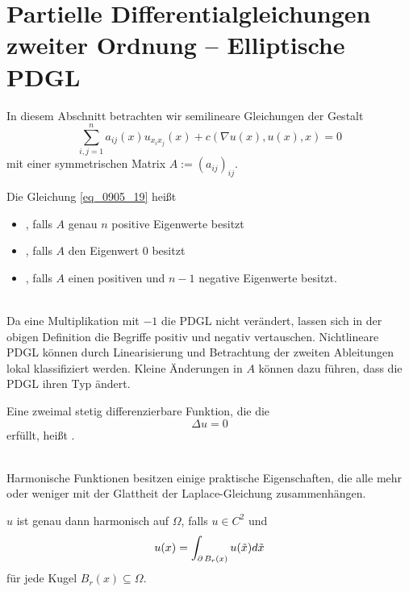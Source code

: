 \section{Partielle Differentialgleichungen zweiter Ordnung -- Elliptische PDGL}
\label{sec:para7}
	In diesem Abschnitt betrachten wir semilineare Gleichungen der Gestalt 
	\begin{equation}
		\sum\limits_{i,j=1}^{n} a_{ij}(x) u_{x_ix_j}(x) + c(\nabla u(x),u(x),x) = 0 \label{eq_0905_19}
	\end{equation}
	mit einer symmetrischen Matrix $A := (a_{ij})_{ij}$.
	
\begin{defn} \label{def_36}
	Die Gleichung \eqref{eq_0905_19} heißt \marginnote{[36]} \begin{itemize}
		\item {}, falls $A$ genau $n$ positive Eigenwerte besitzt
		\item {}, falls $A$ den Eigenwert $0$ besitzt
		\item {}, falls $A$ einen positiven und $n-1$ negative Eigenwerte besitzt.
	\end{itemize}
\end{defn}
	
\mbox{} \\
Da eine Multiplikation mit $-1$ die PDGL nicht verändert, lassen sich in der obigen Definition die Begriffe positiv und negativ vertauschen. Nichtlineare PDGL können durch Linearisierung und Betrachtung der zweiten Ableitungen lokal klassifiziert werden. Kleine Änderungen in $A$ können dazu führen, dass die PDGL ihren Typ ändert.

\begin{defn}
\label{def_37} \label{sub:def_harmonische_fkt}
	Eine zweimal stetig differenzierbare Funktion, die die 
	\begin{equation}
		\Delta u = 0 \label{eq_1305_20}
	\end{equation}
	erfüllt, heißt .
\end{defn}
	
\mbox{} \\
Harmonische Funktionen besitzen einige praktische Eigenschaften, die alle mehr oder weniger mit der Glattheit der Laplace-Gleichung zusammenhängen.

\begin{thm}[Mittelwertformel] \label{thm:mittelwertformel} \label{thm_38}
	$u$ ist genau dann harmonisch auf $\Omega$, falls $u \in C^2$ und \marginnote{[38]}
	\begin{equation}
		u(x) = \int_{\operatorname{\partial} B_r(x)} u(\tilde{x})d\tilde{x} \label{eq_1305_21}
	\end{equation}
	für jede Kugel $B_r(x) \subseteq \Omega$.
\end{thm}
	
